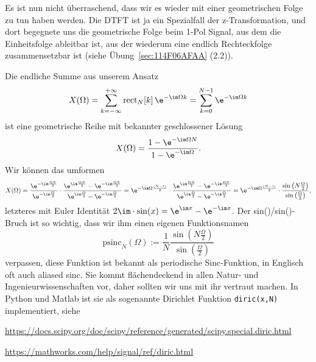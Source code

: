 \begin{ExCalc}
Es ist nun nicht überraschend, dass wir es wieder mit einer geometrischen
Folge zu tun haben werden.
%
Die DTFT ist ja ein Spezialfall der z-Transformation, und dort begegnete uns
die geometrische Folge beim 1-Pol Signal, aus dem die Einheitsfolge ableitbar ist,
aus der wiederum eine endlich Rechteckfolge zusammensetzbar ist (siehe
Übung~\ref{sec:114F06AFAA} (2.2)).

Die endliche Summe aus unserem Ansatz
\begin{align}
\label{eq:ue10_sum_to_psinc}
X(\Omega)
= \sum_{k=-\infty}^{+\infty} \mathrm{rect}_N[k] \, \e^{-\im\Omega k} = \sum_{k=0}^{N-1} \e^{-\im\Omega k}
\end{align}
ist eine geometrische Reihe mit bekannter geschlossener Lösung
\begin{equation}
X(\Omega)=\frac{1-\e^{-\im\Omega N}}{1-\e^{-\im\Omega}}.
\end{equation}
%
Wir können das umformen
%
\begin{equation}
X(\Omega)=\frac{\e^{-\im\frac{\Omega N}{2}}}{\e^{-\im\frac{\Omega}{2}}}\cdot\frac{\e^{\im\frac{\Omega N}{2}}-\e^{-\im\frac{\Omega N}{2}}}{\e^{\im\frac{\Omega}{2}}-\e^{-\im\frac{\Omega}{2}}}
=\e^{-\im\Omega\frac{(N-1)}{2}}\cdot\frac{\e^{\im\frac{\Omega N}{2}}-\e^{-\im\frac{\Omega N}{2}}}{\e^{\im\frac{\Omega}{2}}-\e^{-\im\frac{\Omega}{2}}}
=\e^{-\im\Omega\frac{(N-1)}{2}}\cdot\frac{\sin\left(N\frac{\Omega}{2}\right)}{\sin\left(\frac{\Omega}{2}\right)},
\end{equation}
%
letzteres mit Euler Identität $2\im\cdot\sin(x)=\e^{\im x}-\e^{-\im x}$.
%
Der sin()/sin()-Bruch ist so wichtig, dass wir ihm einen eigenen Funktionsnamen
\begin{equation}
\label{eq:ue10_psinc}
\mathrm{psinc}_N(\Omega) := \frac{1}{N}\frac{\sin\left(N\frac{\Omega}{2}\right)}{\sin\left(\frac{\Omega}{2}\right)}
\end{equation}
verpassen, diese Funktion ist bekannt als periodische Sinc-Funktion, in Englisch
oft auch aliased sinc.
%
Sie kommt flächendeckend in allen Natur- und Ingenieurwissenschaften vor, daher
sollten wir uns mit ihr vertraut machen.
%
In Python und Matlab ist sie als sogenannte Dirichlet Funktion \texttt{diric(x,N)}
implementiert, siehe

\url{https://docs.scipy.org/doc/scipy/reference/generated/scipy.special.diric.html}

\url{https://mathworks.com/help/signal/ref/diric.html}


\end{ExCalc}
